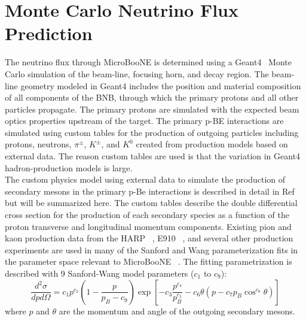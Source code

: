 \section{Monte Carlo Neutrino Flux Prediction}\label{beam_flux_descript_section}

The neutrino flux through MicroBooNE is determined using a Geant4~\cite{GEANT4source} Monte Carlo simulation of the beam-line, focusing horn, and decay region. The beam-line geometry modeled in Geant4 includes the position and material composition of all components of the BNB, through which the primary protons and all other particles propagate. The primary protons are simulated with the expected beam optics properties upstream of the target. The primary p-BE interactions are simulated using custom tables for the production of outgoing particles including protons, neutrons, $\pi^\pm$, $K^\pm$, and $K^0$ created from production models based on external data. The reason custom tables are used is that the variation in Geant4 hadron-production models is large.\\

The custom physics model using external data to simulate the production of secondary mesons in the primary p-Be interactions is described in detail in Ref ~\cite{MBFluxPaper} but will be summarized here. The custom tables describe the double differential cross section for the production of each secondary species as a function of the proton transverse and longitudinal momentum components. Existing pion and kaon production data from the HARP ~\cite{HARPgary8}, E910 ~\cite{E910source}, and several other production experiments are used in many of the Sanford and Wang parameterization fits in the parameter space relevant to MicroBooNE ~\cite{FEYNMANgary6}. The fitting parametrization is described with 9 Sanford-Wang model parameters ($c_1$ to $c_9$):
\begin{equation}\label{SWparamequation}
\frac{d^2\sigma}{dpd\Omega} = c_1p^{c_2}\left(1-\frac{p}{p_B-c_9}\right)\exp\left[-c_3\frac{p^{c_4}}{p_B^{c_5}}-c_6\theta(p-c_7p_B\cos^{c_8}\theta)\right]
\end{equation} 
where $p$ and $\theta$ are the momentum and angle of the outgoing secondary mesons.\\

